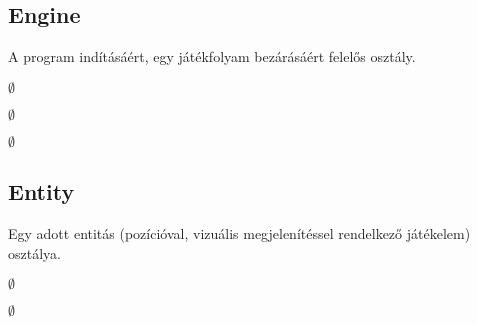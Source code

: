 \subsection{Engine}
\begin{class-template-responsibility}
A program indításáért, egy játékfolyam bezárásáért felelős osztály. 
\end{class-template-responsibility}
\begin{class-template-interface}
$\emptyset$
\end{class-template-interface}
\begin{class-template-baseclass}
$\emptyset$
\end{class-template-baseclass}
\begin{class-template-attribute}
\item[] $\emptyset$
\end{class-template-attribute}
\begin{class-template-method}
\end{class-template-method}


\subsection{Entity}
\begin{class-template-responsibility}
Egy adott entitás (pozícióval, vizuális megjelenítéssel rendelkező játékelem) osztálya. 
\end{class-template-responsibility}
\begin{class-template-interface}
$\emptyset$
\end{class-template-interface}
\begin{class-template-baseclass}
$\emptyset$
\end{class-template-baseclass}
\begin{class-template-attribute}
\end{class-template-attribute}
\begin{class-template-method}
\end{class-template-method}


